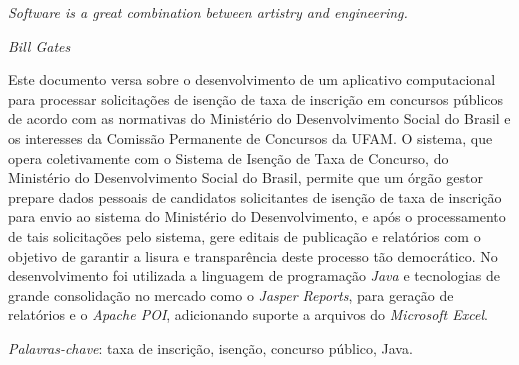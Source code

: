 \documentclass[
	12pt,			%
	openright,		%
	oneside,	
	a4paper,		%
	english,		%
	brazil			%
]{abntex2/abntex2}  %
\begin{document}
	\begin{epigrafe}
		
		\vspace*{\fill}
		\begin{flushright}
			
			\textit{Software is a great combination between artistry and engineering.}

			\textit{Bill Gates}
			
		\end{flushright}\vspace{4cm}
		
	\end{epigrafe}

	\setlength{\absparsep}{18pt}
	\begin{resumo}

		Este documento versa sobre o desenvolvimento de um aplicativo computacional para processar solicitações de isenção de taxa de inscrição em concursos públicos de acordo com as normativas do Ministério do Desenvolvimento Social do Brasil e os interesses da Comissão Permanente de Concursos da UFAM. O sistema, que opera coletivamente com o Sistema de Isenção de Taxa de Concurso, do Ministério do Desenvolvimento Social do Brasil, permite que um órgão gestor prepare dados pessoais de candidatos solicitantes de isenção de taxa de inscrição para envio ao sistema do Ministério do Desenvolvimento, e após o processamento de tais solicitações pelo sistema, gere editais de publicação e relatórios com o objetivo de garantir a lisura e transparência deste processo tão democrático. No desenvolvimento foi utilizada a linguagem de programação \textit{Java} e tecnologias de grande consolidação no mercado como o \textit{Jasper Reports}, para geração de relatórios e o \textit{Apache POI}, adicionando suporte a arquivos do \textit{Microsoft Excel}.

		\vspace{\onelineskip}

		\noindent
		\textit{Palavras-chave}: taxa de inscrição, isenção, concurso público, Java.

	\end{resumo}
\end{document}
